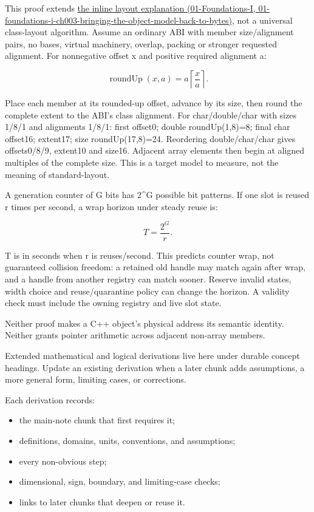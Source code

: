 This proof extends \href{../01-Foundations-I/main.pdf\#nameddest=01-foundations-i-ch003-bringing-the-object-model-back-to-bytes}{the inline layout explanation (01-Foundations-I, 01-foundations-i-ch003-bringing-the-object-model-back-to-bytes)}, not a universal class-layout algorithm. Assume an ordinary ABI with member size/alignment pairs, no bases, virtual machinery, overlap, packing or stronger requested alignment. For nonnegative offset x and positive required alignment a:

\[
\operatorname{roundUp}(x,a)=a\left\lceil\frac{x}{a}\right\rceil.
\]

Place each member at its rounded-up offset, advance by its size, then round the complete extent to the ABI's class alignment. For char/double/char with sizes 1/8/1 and alignments 1/8/1: first offset0; double roundUp(1,8)=8; final char offset16; extent17; size roundUp(17,8)=24. Reordering double/char/char gives offsets0/8/9, extent10 and size16. Adjacent array elements then begin at aligned multiples of the complete size. This is a target model to measure, not the meaning of standard-layout.

A generation counter of G bits has 2\^{}G possible bit patterns. If one slot is reused r times per second, a wrap horizon under steady reuse is:

\[
T=\frac{2^G}{r}.
\]

T is in seconds when r is reuses/second. This predicts counter wrap, not guaranteed collision freedom: a retained old handle may match again after wrap, and a handle from another registry can match sooner. Reserve invalid states, width choice and reuse/quarantine policy can change the horizon. A validity check must include the owning registry and live slot state.

Neither proof makes a C++ object's physical address its semantic identity. Neither grants pointer arithmetic across adjacent non-array members.

Extended mathematical and logical derivations live here under durable concept headings. Update an existing derivation when a later chunk adds assumptions, a more general form, limiting cases, or corrections.

Each derivation records:

\begin{itemize}
\tightlist
\item
  the main-note chunk that first requires it;
\item
  definitions, domains, units, conventions, and assumptions;
\item
  every non-obvious step;
\item
  dimensional, sign, boundary, and limiting-case checks;
\item
  links to later chunks that deepen or reuse it.
\end{itemize}

